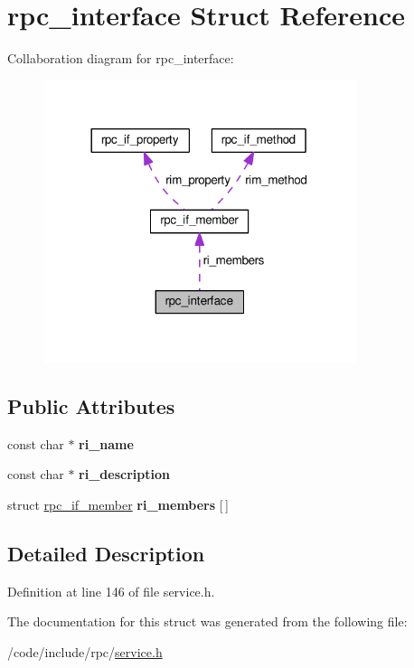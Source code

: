 \hypertarget{structrpc__interface}{}\section{rpc\+\_\+interface Struct Reference}
\label{structrpc__interface}


Collaboration diagram for rpc\+\_\+interface\+:
\nopagebreak
\begin{figure}[H]
\begin{center}
\leavevmode
\includegraphics[width=260pt]{structrpc__interface__coll__graph}
\end{center}
\end{figure}
\subsection*{Public Attributes}
\begin{DoxyCompactItemize}
\item 
const char $\ast$ {\bfseries ri\+\_\+name}\hypertarget{structrpc__interface_a7e1b33ccc8a32e6daaf69ec6daec7bc1}{}\label{structrpc__interface_a7e1b33ccc8a32e6daaf69ec6daec7bc1}

\item 
const char $\ast$ {\bfseries ri\+\_\+description}\hypertarget{structrpc__interface_a851f0bfb495af801a2958fef34596e6a}{}\label{structrpc__interface_a851f0bfb495af801a2958fef34596e6a}

\item 
struct \hyperlink{structrpc__if__member}{rpc\+\_\+if\+\_\+member} {\bfseries ri\+\_\+members} \mbox{[}$\,$\mbox{]}\hypertarget{structrpc__interface_af28bb2a8e330bb25c2c7e681cd2f7356}{}\label{structrpc__interface_af28bb2a8e330bb25c2c7e681cd2f7356}

\end{DoxyCompactItemize}


\subsection{Detailed Description}


Definition at line 146 of file service.\+h.



The documentation for this struct was generated from the following file\+:\begin{DoxyCompactItemize}
\item 
/code/include/rpc/\hyperlink{service_8h}{service.\+h}\end{DoxyCompactItemize}
